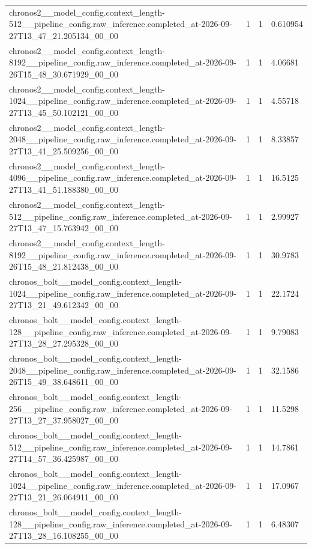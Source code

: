\begin{tabular}{llll}
chronos2\_\_model\_config.context\_length-512\_\_pipeline\_config.raw\_inference.completed\_at-2026-09-27T13\_47\_21.205134\_00\_00 & 1 & 1 & 0.610954 \\
chronos2\_\_model\_config.context\_length-8192\_\_pipeline\_config.raw\_inference.completed\_at-2026-09-26T15\_48\_30.671929\_00\_00 & 1 & 1 & 4.06681 \\
chronos2\_\_model\_config.context\_length-1024\_\_pipeline\_config.raw\_inference.completed\_at-2026-09-27T13\_45\_50.102121\_00\_00 & 1 & 1 & 4.55718 \\
chronos2\_\_model\_config.context\_length-2048\_\_pipeline\_config.raw\_inference.completed\_at-2026-09-27T13\_41\_25.509256\_00\_00 & 1 & 1 & 8.33857 \\
chronos2\_\_model\_config.context\_length-4096\_\_pipeline\_config.raw\_inference.completed\_at-2026-09-27T13\_41\_51.188380\_00\_00 & 1 & 1 & 16.5125 \\
chronos2\_\_model\_config.context\_length-512\_\_pipeline\_config.raw\_inference.completed\_at-2026-09-27T13\_47\_15.763942\_00\_00 & 1 & 1 & 2.99927 \\
chronos2\_\_model\_config.context\_length-8192\_\_pipeline\_config.raw\_inference.completed\_at-2026-09-26T15\_48\_21.812438\_00\_00 & 1 & 1 & 30.9783 \\
chronos\_bolt\_\_model\_config.context\_length-1024\_\_pipeline\_config.raw\_inference.completed\_at-2026-09-27T13\_21\_49.612342\_00\_00 & 1 & 1 & 22.1724 \\
chronos\_bolt\_\_model\_config.context\_length-128\_\_pipeline\_config.raw\_inference.completed\_at-2026-09-27T13\_28\_27.295328\_00\_00 & 1 & 1 & 9.79083 \\
chronos\_bolt\_\_model\_config.context\_length-2048\_\_pipeline\_config.raw\_inference.completed\_at-2026-09-26T15\_49\_38.648611\_00\_00 & 1 & 1 & 32.1586 \\
chronos\_bolt\_\_model\_config.context\_length-256\_\_pipeline\_config.raw\_inference.completed\_at-2026-09-27T13\_27\_37.958027\_00\_00 & 1 & 1 & 11.5298 \\
chronos\_bolt\_\_model\_config.context\_length-512\_\_pipeline\_config.raw\_inference.completed\_at-2026-09-27T14\_57\_36.425987\_00\_00 & 1 & 1 & 14.7861 \\
chronos\_bolt\_\_model\_config.context\_length-1024\_\_pipeline\_config.raw\_inference.completed\_at-2026-09-27T13\_21\_26.064911\_00\_00 & 1 & 1 & 17.0967 \\
chronos\_bolt\_\_model\_config.context\_length-128\_\_pipeline\_config.raw\_inference.completed\_at-2026-09-27T13\_28\_16.108255\_00\_00 & 1 & 1 & 6.48307 \\

\end{tabular}
